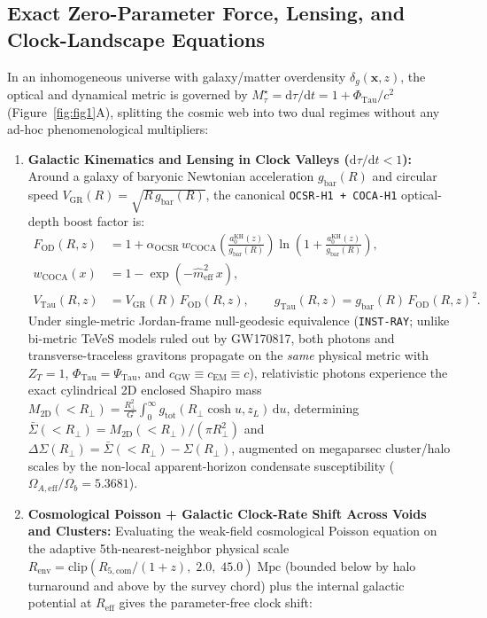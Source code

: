 \documentclass[11pt,a4paper]{article}
\begin{document}
\subsection{Exact Zero-Parameter Force, Lensing, and Clock-Landscape Equations}

In an inhomogeneous universe with galaxy/matter overdensity $\delta_g(\mathbf{x}, z)$, the optical and dynamical metric is governed by $M_\tau^\star = \mathrm{d}\tau/\mathrm{d}t = 1 + \Phi_{\mathrm{Tau}}/c^2$ (Figure~\ref{fig:fig1}A), splitting the cosmic web into two dual regimes without any ad-hoc phenomenological multipliers:
\begin{enumerate}
  \item \textbf{Galactic Kinematics and Lensing in Clock Valleys ($\mathrm{d}\tau/\mathrm{d}t < 1$):} Around a galaxy of baryonic Newtonian acceleration $g_{\mathrm{bar}}(R)$ and circular speed $V_{\mathrm{GR}}(R) = \sqrt{R\,g_{\mathrm{bar}}(R)}$, the canonical \texttt{OCSR-H1 + COCA-H1} optical-depth boost factor is:
  \begin{align}
    F_{\mathrm{OD}}(R, z) &= 1 + \alpha_{\mathrm{OCSR}}\,w_{\mathrm{COCA}}\!\left(\frac{a_0^{\mathrm{KH}}(z)}{g_{\mathrm{bar}}(R)}\right)\ln\!\left(1 + \frac{a_0^{\mathrm{KH}}(z)}{g_{\mathrm{bar}}(R)}\right), \label{eq:f_od} \\
    w_{\mathrm{COCA}}(x) &= 1 - \exp\!\left(-\hat{m}_{\mathrm{eff}}^2\,x\right), \label{eq:w_coca} \\
    V_{\mathrm{Tau}}(R, z) &= V_{\mathrm{GR}}(R)\,F_{\mathrm{OD}}(R, z), \qquad
    g_{\mathrm{Tau}}(R, z) = g_{\mathrm{bar}}(R)\,F_{\mathrm{OD}}(R, z)^2. \label{eq:v_tau}
  \end{align}
  Under single-metric Jordan-frame null-geodesic equivalence (\texttt{INST-RAY}; unlike bi-metric TeVeS models ruled out by GW170817, both photons and transverse-traceless gravitons propagate on the \emph{same} physical metric with $Z_T = 1$, $\Phi_{\mathrm{Tau}} = \Psi_{\mathrm{Tau}}$, and $c_{\mathrm{GW}} \equiv c_{\mathrm{EM}} \equiv c$), relativistic photons experience the exact cylindrical 2D enclosed Shapiro mass $M_{2\mathrm{D}}(<R_\perp) = \frac{R_\perp^2}{G}\int_0^\infty g_{\mathrm{tot}}(R_\perp\cosh u, z_L)\,\mathrm{d}u$, determining $\bar{\Sigma}(<R_\perp) = M_{2\mathrm{D}}(<R_\perp)/(\pi R_\perp^2)$ and $\Delta\Sigma(R_\perp) = \bar{\Sigma}(<R_\perp) - \Sigma(R_\perp)$, augmented on megaparsec cluster/halo scales by the non-local apparent-horizon condensate susceptibility ($\Omega_{A,\mathrm{eff}}/\Omega_b = 5.3681$).
  \item \textbf{Cosmological Poisson + Galactic Clock-Rate Shift Across Voids and Clusters:} Evaluating the weak-field cosmological Poisson equation on the adaptive 5th-nearest-neighbor physical scale $R_{\mathrm{env}} = \mathrm{clip}(R_{5,\mathrm{com}}/(1+z),\; 2.0,\; 45.0)\;\mathrm{Mpc}$ (bounded below by halo turnaround and above by the survey chord) plus the internal galactic potential at $R_{\mathrm{eff}}$ gives the parameter-free clock shift:

\end{enumerate}
\end{document}

